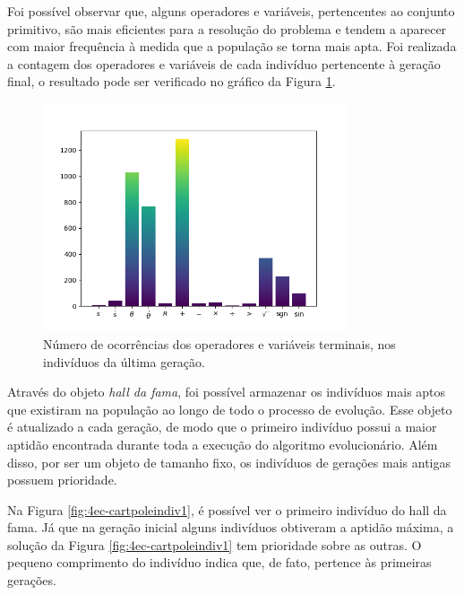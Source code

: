 Foi possível observar que, alguns operadores e variáveis, pertencentes ao conjunto primitivo, são mais eficientes para a resolução do problema e tendem a aparecer com maior frequência à medida que a população se torna mais apta. Foi realizada a contagem dos operadores e variáveis de cada indivíduo pertencente à geração final, o resultado pode ser verificado no gráfico da Figura \ref{fig:4ec-cartpoleoper}.

\begin{figure}[H]
	\centering
	\includegraphics[width=0.8\textwidth]{02_desenvolvimento/04_EC_Fig_CartpoleOper.png}
	\caption{Número de ocorrências dos operadores e variáveis terminais, nos indivíduos da última geração.}
	\label{fig:4ec-cartpoleoper}
\end{figure}

Através do objeto \textit{hall da fama}, foi possível armazenar os indivíduos mais aptos que existiram na população ao longo de todo o processo de evolução. Esse objeto é atualizado a cada geração, de modo que o primeiro indivíduo possui a maior aptidão encontrada durante toda a execução do algoritmo evolucionário. Além disso, por ser um objeto de tamanho fixo, os indivíduos de gerações mais antigas possuem prioridade.

Na Figura \ref{fig:4ec-cartpoleindiv1}, é possível ver o primeiro indivíduo do hall da fama. Já que na geração inicial alguns indivíduos obtiveram a aptidão máxima, a solução da Figura \ref{fig:4ec-cartpoleindiv1} tem prioridade sobre as outras. O pequeno comprimento do indivíduo indica que, de fato, pertence às primeiras gerações.

